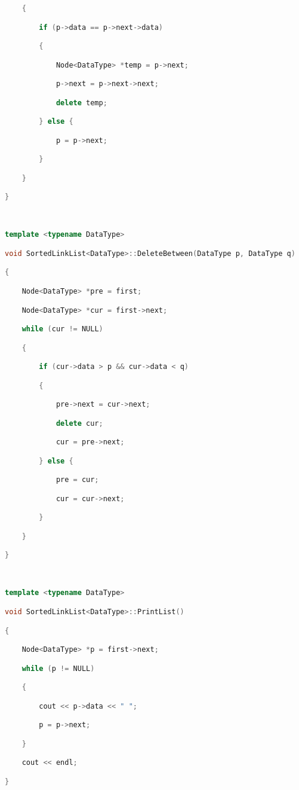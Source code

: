 \begin{lstlisting}[language=C++]
    {

        if (p->data == p->next->data)

        {

            Node<DataType> *temp = p->next;

            p->next = p->next->next;

            delete temp;

        } else {

            p = p->next;

        }

    }

}

  

template <typename DataType>

void SortedLinkList<DataType>::DeleteBetween(DataType p, DataType q)

{

    Node<DataType> *pre = first;

    Node<DataType> *cur = first->next;

    while (cur != NULL)

    {

        if (cur->data > p && cur->data < q)

        {

            pre->next = cur->next;

            delete cur;

            cur = pre->next;

        } else {

            pre = cur;

            cur = cur->next;

        }

    }

}

  

template <typename DataType>

void SortedLinkList<DataType>::PrintList()

{

    Node<DataType> *p = first->next;

    while (p != NULL)

    {

        cout << p->data << " ";

        p = p->next;

    }

    cout << endl;

}

  


\end{lstlisting}
